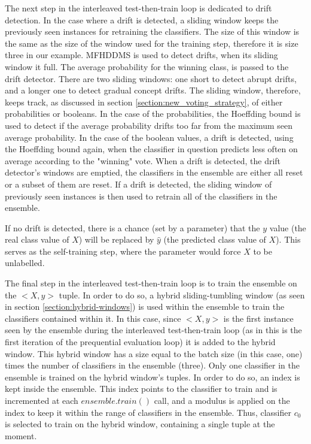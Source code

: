 The next step in the interleaved test-then-train loop is dedicated to drift detection. In the case where a drift is detected, a sliding window keeps the previously seen instances for retraining the classifiers. The size of this window is the same as the size of the window used for the training step, therefore it is size three in our example. MFHDDMS is used to detect drifts, when its sliding window it full. The average probability for the winning class, is passed to the drift detector. There are two sliding windows: one short to detect abrupt drifts, and a longer one to detect gradual concept drifts. The sliding window, therefore, keeps track, as discussed in section \ref{section:new_voting_strategy}, of either probabilities or booleans. In the case of the probabilities, the Hoeffding bound is used to detect if the average probability drifts too far from the maximum seen average probability. In the case of the boolean values, a drift is detected, using the Hoeffding bound again, when the classifier in question predicts less often on average according to the "winning" vote.
When a drift is detected, the drift detector's windows are emptied, the classifiers in the ensemble are either all reset or a subset of them are reset. 
If a drift is detected, the sliding window of previously seen instances is then used to retrain all of the classifiers in the ensemble.

If no drift is detected, there is a chance (set by a parameter) that the $y$ value (the real class value of $X$) will be replaced by $\hat y$ (the predicted class value of $X$). This serves as the self-training step, where the parameter would force $X$ to be unlabelled.

The final step in the interleaved test-then-train loop is to train the ensemble on the $<X, y>$ tuple. In order to do so, a hybrid sliding-tumbling window (as seen in section \ref{section:hybrid-windows}) is used within the ensemble to train the classifiers contained within it. In this case, since $<X, y>$ is the first instance seen by the ensemble during the interleaved test-then-train loop (as in this is the first iteration of the prequential evaluation loop) it is added to the hybrid window. This hybrid window has a size equal to the batch size (in this case, one) times the number of classifiers in the ensemble (three). 
Only one classifier in the ensemble is trained on the hybrid window's tuples. In order to do so, an index is kept inside the ensemble. This index points to the classifier to train and is incremented at each $ensemble.train()$ call, and a modulus is applied on the index to keep it within the range of classifiers in the ensemble.
Thus, classifier $c_0$ is selected to train on the hybrid window, containing a single tuple at the moment.

